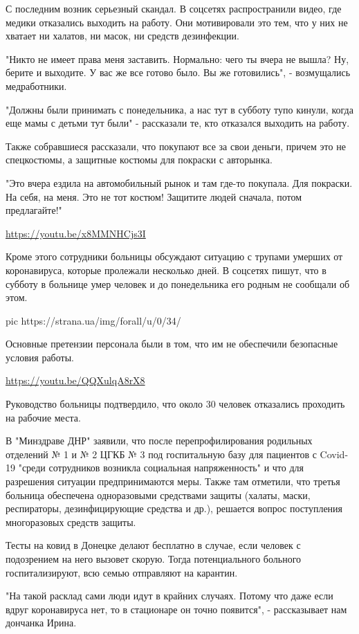 С последним возник серьезный скандал. В соцсетях распространили видео, где
медики отказались выходить на работу. Они мотивировали это тем, что у них не
хватает ни халатов, ни масок, ни средств дезинфекции.

"Никто не имеет права меня заставить. Нормально: чего ты вчера не вышла? Ну,
берите и выходите. У вас же все готово было. Вы же готовились", - возмущались
медработники.

"Должны были принимать с понедельника, а нас тут в субботу тупо кинули, когда
еще мамы с детьми тут были" - рассказали те, кто отказался выходить на работу.

Также собравшиеся рассказали, что покупают все за свои деньги, причем это не
спецкостюмы, а защитные костюмы для покраски с авторынка.

"Это вчера ездила на автомобильный рынок и там где-то покупала. Для покраски.
На себя, на меня. Это не тот костюм! Защитите людей сначала, потом
предлагайте!"

\url{https://youtu.be/x8MMNHCjs3I}

Кроме этого сотрудники больницы обсуждают ситуацию с трупами умерших от
коронавируса, которые пролежали несколько дней. В соцсетях пишут, что в субботу
в больнице умер человек и до понедельника его родным не сообщали об этом.

\ifcmt
pic https://strana.ua/img/forall/u/0/34/%
\fi

Основные претензии персонала были в том, что им не обеспечили безопасные
условия работы.

\url{https://youtu.be/QQXulqA8rX8}

Руководство больницы подтвердило, что около 30 человек отказались проходить на
рабочие места.

В "Минздраве ДНР" заявили, что после перепрофилирования родильных отделений № 1
и № 2 ЦГКБ № 3 под госпитальную базу для пациентов с Covid-19 "среди
сотрудников возникла социальная напряженность" и что для разрешения ситуации
предпринимаются меры. Также там отметили, что третья больница обеспечена
одноразовыми средствами защиты (халаты, маски, респираторы, дезинфицирующие
средства и др.), решается вопрос поступления многоразовых средств защиты.

Тесты на ковид в Донецке делают бесплатно в случае, если человек с подозрением
на него вызовет скорую. Тогда потенциального больного госпитализируют, всю
семью отправляют на карантин.

"На такой расклад сами люди идут в крайних случаях. Потому что даже если вдруг
коронавируса нет, то в стационаре он точно появится", - рассказывает нам
дончанка Ирина. 


